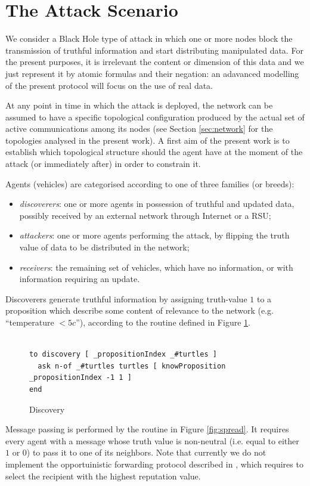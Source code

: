 \documentclass[compsoc, conference, letterpaper, 10pt, times]{IEEEtran}
\begin{document}
\section{The Attack Scenario}\label{sec:attack}

We consider a Black Hole type of attack in which one or more nodes block the transmission of truthful information and start distributing manipulated data. For the present purposes, it is irrelevant the content or dimension of this data and we just represent it by atomic formulas and their negation: an adavanced modelling of the present protocol will focus on the use of real data.

At any point in time in which the attack is deployed, the network can be assumed to have a specific topological configuration produced by the actual set of active communications among its nodes (see Section \ref{sec:network} for the topologies analysed in the present work). A first aim of the present work is to establish which topological structure should the agent have at the moment of the attack (or immediately after) in order to constrain it.

Agents (vehicles) are categorised according to one of three families (or breeds):

\begin{itemize}
\item \textit{discoverers}: one or more agents in possession of truthful and updated data, possibly received by an external network through Internet or a RSU;
\item \textit{attackers}: one or more agents performing the attack, by flipping the truth value of data to be distributed in the network;
\item \textit{receivers}: the remaining set of vehicles, which have no information, or with information requiring an update.
\end{itemize}
Discoverers generate truthful information by assigning truth-value $1$ to a proposition which describe some content of relevance to the network (e.g. ``temperature $<5c$''), according to the routine defined in Figure \ref{fig:discovery}.

\begin{figure}[t]
 	\lstset{language=Java,
 		basicstyle=\scriptsize,
 		mathescape}
 	\begin{lstlisting}[frame=single]  % Start your code-block

to discovery [ _propositionIndex _#turtles ]
  ask n-of _#turtles turtles [ knowProposition _propositionIndex -1 1 ]
end
\end{lstlisting}
\caption{Discovery}\label{fig:discovery}
%
\end{figure}
Message passing is performed by the routine in Figure \ref{fig:spread}. It requires every agent with a message whose truth value is non-neutral (i.e. equal to either $1$ or $0$) to pass it to one of its neighbors. Note that currently we do not implement the opportuinistic forwarding protocol described in \cite{glenford}, which requires to select the recipient with the highest reputation value.
\end{document}
